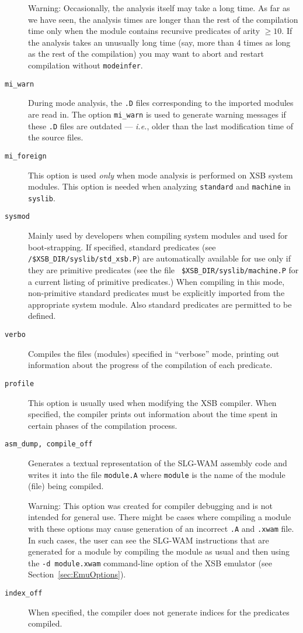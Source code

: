 \begin{description}
	{\sc Warning:}
	Occasionally, the analysis itself may take a long time. 
	As far as we have seen,
	the analysis times are longer than the rest of the compilation time
	only when the module contains recursive predicates of arity $\geq 10$.
	If the analysis takes an unusually long time
	(say, more than 4 times as long as the rest of the compilation)
	you may want to abort and restart compilation without {\tt modeinfer}.
	
\item[{\tt mi\_warn}]
	During mode analysis, the {\tt .D} files corresponding to the
	imported modules are read in. The option {\tt mi\_warn} is used
	to generate warning messages if these {\tt .D} files are 
	outdated --- {\em i.e.}, older
	than the last modification time of the source files.

\item[{\tt mi\_foreign}] This option is used {\em only\/} when mode analysis
	is performed on XSB system modules. This option is
	needed when analyzing {\tt standard} and {\tt machine} in
	{\tt syslib}.


\item[{\tt sysmod}]  
%
Mainly used by developers when compiling system modules and used for
boot-strapping. If specified, standard predicates (see {\tt
  /\$XSB\_DIR/syslib/std\_xsb.P}) are automatically available for use
only if they are primitive predicates (see the file {\tt
  \$XSB\_DIR/syslib/machine.P} for a current listing of primitive
predicates.)  When compiling in this mode, non-primitive standard
predicates must be explicitly imported from the appropriate system
module.  Also standard predicates are permitted to be defined.
%
\item[{\tt verbo}] Compiles the files (modules) specified in ``verbose'' mode, 
	printing out information about the progress of the compilation of each 
	predicate.
%
\item[{\tt profile}] This option is usually used when modifying the
  XSB compiler.  When specified, the compiler prints out information
  about the time spent in certain phases of the compilation process.
%
\item[{\tt asm\_dump, compile\_off}] Generates a textual representation of 
	the SLG-WAM assembly code and writes it into the file {\tt module.A}
	where {\tt module} is the name of the module (file) being compiled.  
	
	{\sc Warning:} This option was created for compiler debugging and is
		not intended for general use.  There might be cases where
		compiling a module with these options may cause generation
		of an incorrect {\tt .A} and {\tt .xwam} file.  In such cases,
		the user can see the SLG-WAM instructions that are
		generated for a module by compiling the module as usual and
		then using the {\tt -d module.xwam} command-line
		option of the 
		XSB emulator (see Section~\ref{sec:EmuOptions}).
\item[{\tt index\_off}] When specified, the compiler does not generate indices
	for the predicates compiled.  
\end{description}


